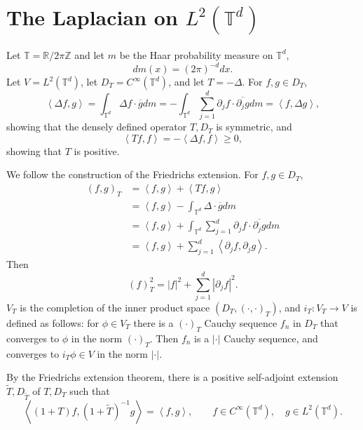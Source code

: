 \documentclass{article}
\newcommand{\inner}[2]{\left\langle #1, #2 \right\rangle}
\theoremstyle{definition}
\begin{document}
\section{The Laplacian on $L^2(\mathbb{T}^d)$}
Let $\mathbb{T} = \mathbb{R} / 2\pi\mathbb{Z}$ and let
$m$ be the Haar probability measure on $\mathbb{T}^d$,
\[
dm(x) = (2\pi)^{-d} dx.
\]
Let $V=L^2(\mathbb{T}^d)$,  let
$D_T = C^\infty(\mathbb{T}^d)$, and let
 $T=-\Delta$. For
$f,g \in D_T$,
\[
\inner{\Delta f}{g} = \int_{\mathbb{T}^d}  \Delta f \cdot \overline{g} dm
=- \int_{\mathbb{T}^d} \sum_{j=1}^d  \partial_j f \cdot \overline{\partial_j g} dm
= \inner{f}{\Delta g},
\]
showing that the densely defined operator $T,D_T$ is symmetric, and 
\[
\inner{Tf}{f} = -\inner{\Delta f}{f} \geq 0,
\]
showing that $T$ is positive. 

We follow the construction of the Friedrichs extension. For $f,g \in D_T$,
\begin{align*}
(f,g)_T &= \inner{f}{g}+\inner{Tf}{g}\\
& =\inner{f}{g} - 
\int_{\mathbb{T}^d} \Delta  \cdot \overline{g} dm\\
&=\inner{f}{g}+ \int_{\mathbb{T}^d} \sum_{j=1}^d \partial_j f \cdot \overline{\partial_j g} dm\\
&= \inner{f}{g} + \sum_{j=1}^d \inner{\partial_j f}{\partial_j g}.
\end{align*}
Then
\[
(f)_T^2 = |f|^2 + \sum_{j=1}^d |\partial_j f|^2.
\]
$V_T$ is the completion of  the inner product space $(D_T,(\cdot,\cdot)_T)$, and $i_T:V_T \to V$ is defined as follows: 
for $\phi \in V_T$ there is a  $(\cdot)_T$ Cauchy sequence $f_n$ in $D_T$ that converges to $\phi$ in the norm
$(\cdot)_T$. Then $f_n$ is a $|\cdot|$ Cauchy sequence,
and converges to $i_T \phi \in V$ in the norm $|\cdot|$. 



By the Friedrichs extension theorem, there is a positive self-adjoint extension $\widetilde{T},D_{\widetilde{T}}$ 
of $T,D_T$ such that
\[
\inner{(1+T)f}{(1+\widetilde{T})^{-1}g} = \inner{f}{g},\qquad f \in C^\infty(\mathbb{T}^d),
\quad g \in L^2(\mathbb{T}^d).
\]
\end{document}
